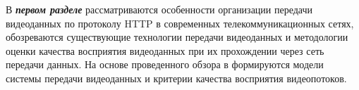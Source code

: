 В \textbf{\textit{первом разделе}} рассматриваются особенности организации передачи видеоданных по протоколу HTTP в современных телекоммуникационных сетях, обозреваются существующие технологии передачи видеоданных и методологии оценки качества восприятия видеоданных при их прохождении через сеть передачи данных. На основе проведенного обзора в формируются модели системы передачи видеоданных и критерии качества восприятия видеопотоков.


